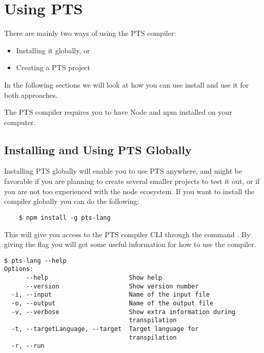 
\chapter{Using PTS}\label{ch:using-pts}

There are mainly two ways of using the PTS compiler:

\begin{itemize}
    \item Installing it globally, or
    \item Creating a PTS project
\end{itemize}

In the following sections we will look at how you can use install and use it for both approaches.

The PTS compiler requires you to have Node and npm installed on your computer.

\section{Installing and Using PTS Globally}\label{sec:installing-and-using-pts-globally}

Installing PTS globally will enable you to use PTS anywhere, and might be favorable if you are planning to create several smaller projects to test it out, or if you are not too experienced with the node ecosystem.
If you want to install the compiler globally you can do the following:

\begin{verbatim}
    $ npm install -g pts-lang
\end{verbatim}

This will give you access to the PTS compiler CLI through the command .
By giving the  flag you will get some useful information for how to use the compiler.

\begin{verbatim}
$ pts-lang --help
Options:
      --help                      Show help
      --version                   Show version number
  -i, --input                     Name of the input file
  -o, --output                    Name of the output file
  -v, --verbose                   Show extra information during
                                  transpilation
  -t, --targetLanguage, --target  Target language for
                                  transpilation
  -r, --run
\end{verbatim}

